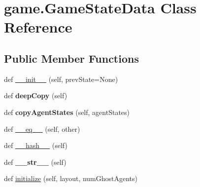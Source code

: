 \hypertarget{classgame_1_1_game_state_data}{}\section{game.\+Game\+State\+Data Class Reference}
\label{classgame_1_1_game_state_data}
\subsection*{Public Member Functions}
\begin{DoxyCompactItemize}
\item 
def \hyperlink{classgame_1_1_game_state_data_a764ef0d670ccef7010e70f95481ee80f}{\+\_\+\+\_\+init\+\_\+\+\_\+} (self, prev\+State=None)
\item 
\mbox{\label{classgame_1_1_game_state_data_a6e7bd5a57dd3ba2ce08bbb9cf34eb059}} 
def {\bfseries deep\+Copy} (self)
\item 
\mbox{\label{classgame_1_1_game_state_data_ac376b6f3b6aa2d05117ad3bf35529f19}} 
def {\bfseries copy\+Agent\+States} (self, agent\+States)
\item 
def \hyperlink{classgame_1_1_game_state_data_ab9100acd3f840cbe9bdf8a40eda19e73}{\+\_\+\+\_\+eq\+\_\+\+\_\+} (self, other)
\item 
def \hyperlink{classgame_1_1_game_state_data_a206fb476b979a446a4f11e3b0b0b8e23}{\+\_\+\+\_\+hash\+\_\+\+\_\+} (self)
\item 
\mbox{\label{classgame_1_1_game_state_data_ad0a8c7e780b172d171ebd0c05b5d9ecc}} 
def {\bfseries \+\_\+\+\_\+str\+\_\+\+\_\+} (self)
\item 
def \hyperlink{classgame_1_1_game_state_data_a6d54572aa8882da95c81921b89c0791b}{initialize} (self, layout, num\+Ghost\+Agents)
\end{DoxyCompactItemize}
